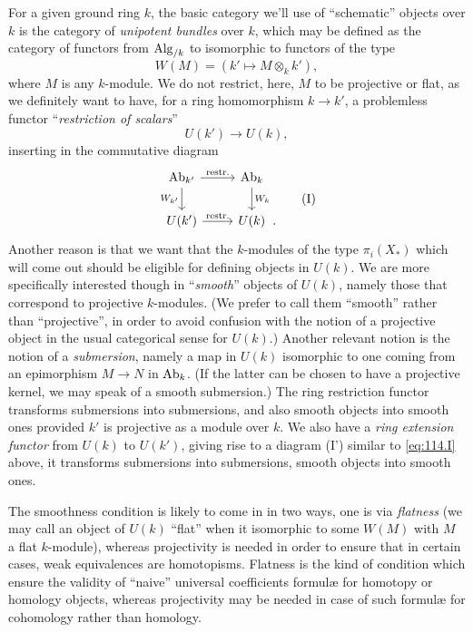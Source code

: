 For a given ground ring $k$, the basic category we'll use
of ``schematic'' objects over $k$ is the category of \emph{unipotent
  bundles} over $k$, which may be defined as the category of functors
from $\operatorname{Alg}_{/k}$ to \Sets{} isomorphic to functors of the type
\[W(M) = (k' \mapsto M\otimes_k k'),\]
where $M$ is any $k$-module. We do not restrict, here, $M$ to be
projective or flat, as we definitely want to have, for a ring
homomorphism $k\to k'$, a problemless functor ``\emph{restriction of
  scalars}''
\[U(k')\to U(k),\]
inserting in the commutative diagram
\begin{equation}
  \label{eq:114.I}
  \begin{tabular}{@{}c@{}}
    \begin{tikzcd}[baseline=(O.base)]
      \AbOf_{k'}\ar[r,"\text{restr.}"]\ar[d,"W_{k'}"'] &
      \AbOf_k\ar[d,"W_k"] \\
      U(k')\ar[r,"\text{restr.}"] &
      |[alias=O]| U(k)
    \end{tikzcd}.
  \end{tabular}\tag{I}
\end{equation}
Another reason is that we want that the $k$-modules of the type
$\pi_i(X_*)$ which will come out should be eligible for defining
objects in $U(k)$. We are more specifically interested though in
``\emph{smooth}'' objects of $U(k)$, namely those that correspond to
projective $k$-modules. (We prefer to call them ``smooth'' rather than
``projective'', in order to avoid confusion with the notion of a
projective object in the usual categorical sense for $U(k)$.) Another
relevant notion is the notion of a \emph{submersion}, namely a map in
$U(k)$ isomorphic to one coming from an epimorphism $M\to N$ in
$\operatorname{Ab}_k$. (If the latter can be chosen to have a projective kernel,
we may speak of a smooth submersion.) The ring restriction functor
transforms submersions into submersions, and also smooth objects into
smooth ones provided $k'$ is projective as a module over $k$. We also
have a \emph{ring extension functor} from $U(k)$ to $U(k')$, giving
rise to a diagram (I') similar to \eqref{eq:114.I} above, it
transforms submersions into submersions, smooth objects into smooth
ones.

The smoothness condition is likely to come in in two ways, one is via
\emph{flatness} (we may call an object of $U(k)$ ``flat'' when it
isomorphic to some $W(M)$ with $M$ a flat $k$-module), whereas
projectivity is needed in order to ensure that in certain cases, weak
equivalences are homotopisms. Flatness is the kind of condition which
ensure the validity of ``naive'' universal coefficients formulæ for
homotopy or homology objects, whereas projectivity may be needed in
case of such formulæ for cohomology rather than homology.


